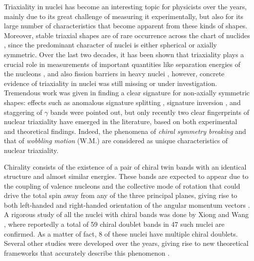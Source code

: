 \documentclass[11pt]{article}
\begin{document}
Triaxiality in nuclei has become an interesting topic for physicists over the years, mainly due to its great challenge of measuring it experimentally, but also for its large number of characteristics that become apparent from these kinds of shapes. Moreover, stable triaxial shapes are of rare occurrence across the chart of nuclides \cite{moller2006global}, since the predominant character of nuclei is either spherical or axially symmetric. Over the last two decades, it has been shown that triaxiality plays a crucial role in measurements of important quantities like  separation energies of the nucleons \cite{moller2006global}, and also fission barriers in heavy nuclei  \cite{moller2009heavy}, however, concrete evidence of triaxiality in nuclei was still missing or under investigation. Tremendous work was given in finding a clear signature for non-axially symmetric shapes: effects such as anomalous signature splitting \cite{hamamoto1988triaxial}, signature inversion \cite{bengtsson1984signature}, and staggering of $\gamma$ bands \cite{stachel1982triaxiality} were pointed out, but only recently two clear fingerprints of nuclear triaxiality have emerged in the literature, based on both experimental and theoretical findings. Indeed, the phenomena of \emph{chiral symmetry breaking} \cite{frauendorf1997tilted} and that of \emph{wobbling motion} (W.M.) \cite{bohr1998nuclear} are considered as unique characteristics of nuclear triaxiality. 

Chirality consists of the existence of a pair of chiral twin bands with an identical structure and almost similar energies. These bands are expected to appear due to the coupling of valence nucleons and the collective mode of rotation that could drive the total spin away from any of the three principal planes, giving rise to both left-handed and right-handed orientation of the angular momentum vectors \cite{frauendorf1997tilted}. A rigorous study of all the nuclei with chiral bands was done by Xiong and Wang \cite{xiong2019nuclear}, where reportedly a total of 59 chiral doublet bands in 47 such nuclei are confirmed. As a matter of fact, 8 of these nuclei have multiple chiral doublets. Several other studies were developed over the years, giving rise to new theoretical frameworks that accurately describe this phenomenon \cite{dimitrov2000chirality,koike2003systematic,meng2006possible,raduta2016new,petrache2018evidence,lv2019chirality}.
\end{document}
